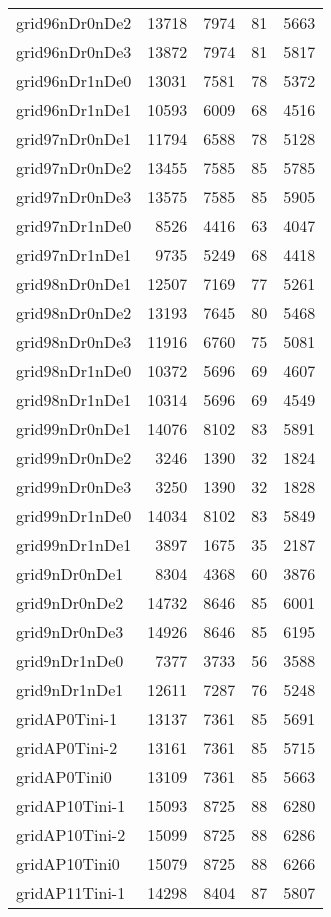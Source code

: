 \begin{longtable}{lrrrr}
grid96nDr0nDe2 & 13718 & 7974 & 81 & 5663 \\
grid96nDr0nDe3 & 13872 & 7974 & 81 & 5817 \\
grid96nDr1nDe0 & 13031 & 7581 & 78 & 5372 \\
grid96nDr1nDe1 & 10593 & 6009 & 68 & 4516 \\
grid97nDr0nDe1 & 11794 & 6588 & 78 & 5128 \\
grid97nDr0nDe2 & 13455 & 7585 & 85 & 5785 \\
grid97nDr0nDe3 & 13575 & 7585 & 85 & 5905 \\
grid97nDr1nDe0 & 8526 & 4416 & 63 & 4047 \\
grid97nDr1nDe1 & 9735 & 5249 & 68 & 4418 \\
grid98nDr0nDe1 & 12507 & 7169 & 77 & 5261 \\
grid98nDr0nDe2 & 13193 & 7645 & 80 & 5468 \\
grid98nDr0nDe3 & 11916 & 6760 & 75 & 5081 \\
grid98nDr1nDe0 & 10372 & 5696 & 69 & 4607 \\
grid98nDr1nDe1 & 10314 & 5696 & 69 & 4549 \\
grid99nDr0nDe1 & 14076 & 8102 & 83 & 5891 \\
grid99nDr0nDe2 & 3246 & 1390 & 32 & 1824 \\
grid99nDr0nDe3 & 3250 & 1390 & 32 & 1828 \\
grid99nDr1nDe0 & 14034 & 8102 & 83 & 5849 \\
grid99nDr1nDe1 & 3897 & 1675 & 35 & 2187 \\
grid9nDr0nDe1 & 8304 & 4368 & 60 & 3876 \\
grid9nDr0nDe2 & 14732 & 8646 & 85 & 6001 \\
grid9nDr0nDe3 & 14926 & 8646 & 85 & 6195 \\
grid9nDr1nDe0 & 7377 & 3733 & 56 & 3588 \\
grid9nDr1nDe1 & 12611 & 7287 & 76 & 5248 \\
gridAP0Tini-1 & 13137 & 7361 & 85 & 5691 \\
gridAP0Tini-2 & 13161 & 7361 & 85 & 5715 \\
gridAP0Tini0 & 13109 & 7361 & 85 & 5663 \\
gridAP10Tini-1 & 15093 & 8725 & 88 & 6280 \\
gridAP10Tini-2 & 15099 & 8725 & 88 & 6286 \\
gridAP10Tini0 & 15079 & 8725 & 88 & 6266 \\
gridAP11Tini-1 & 14298 & 8404 & 87 & 5807 \\

\end{longtable}
